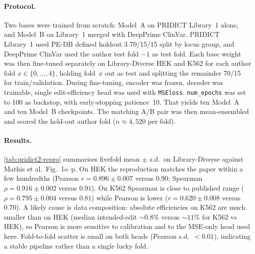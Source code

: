 \documentclass{article}
\begin{document}
\paragraph{Protocol.}
Two bases were trained from scratch: Model~A on PRIDICT Library~1 alone, and Model~B on Library~1 merged with DeepPrime ClinVar. PRIDICT Library~1 used PE-DB defined holdout 3 70/15/15 split by locus group, and DeepPrime ClinVar used the author test fold $-1$ as test fold. Each base weight was then fine-tuned separately on Library-Diverse HEK and K562 for each author fold $x \in \{0,\ldots,4\}$, holding fold~$x$ out as test and splitting the remainder 70/15 for train/validation. During fine-tuning, encoder was frozen, decoder was trainable, single edit-efficiency head was used with \nolinkurl{MSEloss}. \nolinkurl{num\_epochs} was set to 100 as backstop, with early-stopping patience~10. That yields ten Model~A and ten Model~B checkpoints. The matching A/B pair was then mean-ensembled and scored the held-out author fold ($n \approx 4{,}520$ per fold).

\paragraph{Results.}
\autoref{tab:pridict2-repro} summarises fivefold mean $\pm$ s.d.\ on Library-Diverse against Mathis et al.\ Fig.~1o--p. On HEK the reproduction matches the paper within a few hundredths (Pearson $r = 0.896 \pm 0.007$ versus $0.90$; Spearman $\rho = 0.916 \pm 0.002$ versus $0.91$). On K562 Spearman is close to published range ($\rho = 0.795 \pm 0.004$ versus $0.81$) while Pearson is lower ($r = 0.620 \pm 0.008$ versus $0.70$). A likely cause is data composition: absolute efficiencies on K562 are much smaller than on HEK (median intended-edit ${\sim}0.8\%$ versus ${\sim}11\%$ for K562 vs HEK), so Pearson is more sensitive to calibration and to the MSE-only head used here. Fold-to-fold scatter is small on both heads (Pearson s.d.\ $<0.01$), indicating a stable pipeline rather than a single lucky fold.


\end{document}
